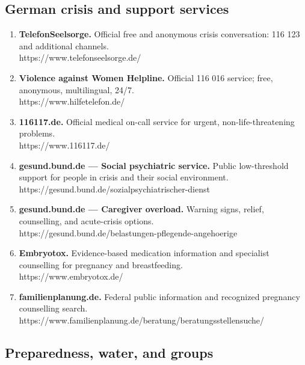\hypertarget{german-crisis-and-support-services}{%
\subsection{German crisis and support
services}\label{german-crisis-and-support-services}}

\begin{enumerate}
\def\labelenumi{\arabic{enumi}.}
\setcounter{enumi}{13}
\item
  \textbf{TelefonSeelsorge.} Official free and anonymous crisis
  conversation: 116 123 and additional channels.\\
  https://www.telefonseelsorge.de/
\item
  \textbf{Violence against Women Helpline.} Official 116 016 service;
  free, anonymous, multilingual, 24/7.\\
  https://www.hilfetelefon.de/
\item
  \textbf{116117.de.} Official medical on-call service for urgent,
  non-life-threatening problems.\\
  https://www.116117.de/
\item
  \textbf{gesund.bund.de --- Social psychiatric service.} Public
  low-threshold support for people in crisis and their social
  environment.\\
  https://gesund.bund.de/sozialpsychiatrischer-dienst
\item
  \textbf{gesund.bund.de --- Caregiver overload.} Warning signs, relief,
  counselling, and acute-crisis options.\\
  https://gesund.bund.de/belastungen-pflegende-angehoerige
\item
  \textbf{Embryotox.} Evidence-based medication information and
  specialist counselling for pregnancy and breastfeeding.\\
  https://www.embryotox.de/
\item
  \textbf{familienplanung.de.} Federal public information and recognized
  pregnancy counselling search.\\
  https://www.familienplanung.de/beratung/beratungsstellensuche/
\end{enumerate}

\hypertarget{preparedness-water-and-groups}{%
\subsection{Preparedness, water, and
groups}\label{preparedness-water-and-groups}}

